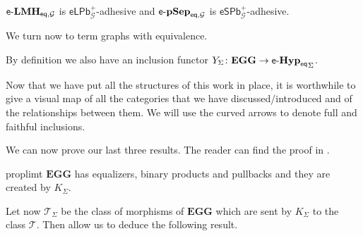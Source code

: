 \documentclass[3p]{elsarticle}
\newcommand{\epbl}{\mathsf{eLPb}^{+}}
\newcommand{\epbs}{\mathsf{eSPb}^{+}}
\newcommand{\eq}{\mathsf{eq}}
\newcommand{\eg}[0]{\mathbf{EGG}}
\newcommand{\catname}[1]{\textbf{\textup{#1}}}
\newcommand{\hyp}{\catname{Hyp}}
\newcommand{\EqHyp}{\catname{Hyp}_{\mathsf{eq}}} %
\newcommand{\EqHyps}{\catname{Hyp}_{\mathsf{eq}, \mathcal{G}}}
\newcommand{\EqTG}{\catname{EqTG}}
\newcommand{\tg}[0]{\catname{TG}_{\Sigma}}
\newcommand{\egg}{\mathsf{e}\text{-}\catname{Hyp}_\eq}
\newcommand{\lelm}{\mathsf{e}\text{-}\catname{LMH}_{\eq, \mathcal{G}}}
\newcommand{\leps}{\mathsf{e}\text{-}\catname{pSep}_{\eq, \mathcal{G}}}
\theoremstyle{remark}
\theoremstyle{definition}
\begin{document}
\begin{cor}\label{cor:last}
	$\lelm$ is $\epbl_{\mathcal{G}}$-adhesive and $\leps$ is $\epbs_{\mathcal{G}}$-adhesive.
\end{cor}


\iffalse 
We turn now to term graphs with equivalence.


\begin{rem}
	By definition we also have an inclusion functor $Y_\Sigma\colon \eg\to {\egg}_\Sigma$.
\end{rem}

\noindent 
\begin{minipage}[l]{.58\linewidth}
	\begin{rem}
		Now that we have put all the structures of this work in place, it is worthwhile to give a visual map of all the categories that we have discussed/introduced and of the relationships between them. We will use the curved arrows to denote full and faithful inclusions.
	\end{rem}
\end{minipage}\hfill

We can now prove our last three results. The reader can find the proof in .

\begin{restatable}{prop}{limt}\label{prop:limt}
	$\eg$ has equalizers, binary products and pullbacks and they are created by $K_\Sigma$.
\end{restatable}

Let now $\mathcal{T}_\Sigma$ be the class of morphisms of $\eg$ which are sent by $K_\Sigma$ to the class $\mathcal{T}$. Then  allow us to deduce the following result.
\end{document}
